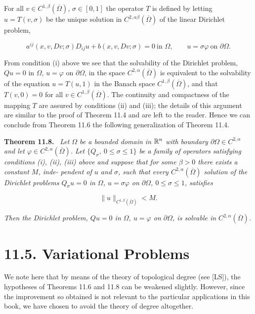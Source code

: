 \noindent For all $v\in C^{1,\beta}(\overline{\Omega})$, $\sigma\in[0,1]$ the operator $T$ is defined by letting $u=T(v,\sigma)$ be the
unique solution in $C^{2,\alpha\beta}(\overline{\Omega})$ of the linear Dirichlet problem,

\[
a^{ij}(x,v,Dv;\sigma)D_{ij}u+b(x,v,Dv;\sigma)=0\ \text{in }\Omega,\qquad u=\sigma\varphi\ \text{on }\partial\Omega.
\]

\noindent From condition (i) above we see that the solvability of the Dirichlet problem,
$Qu=0$ in $\Omega$, $u=\varphi$ on $\partial\Omega$, in the space $C^{2,\alpha}(\overline{\Omega})$ is equivalent to the solvability of
the equation $u=T(u,1)$ in the Banach space $C^{1,\beta}(\overline{\Omega})$, and that $T(v,0)=0$ for all
$v\in C^{1,\beta}(\overline{\Omega})$. The continuity and compactness of the mapping $T$ are assured by
conditions (ii) and (iii); the details of this argument are similar to the proof of
Theorem 11.4 and are left to the reader. Hence we can conclude from Theorem 11.6
the following generalization of Theorem 11.4.

\bigskip

\noindent \textbf{Theorem 11.8.} \ \emph{Let $\Omega$ be a bounded domain in $\mathbb{R}^n$ with boundary $\partial\Omega\in C^{2,\alpha}$ and let
$\varphi\in C^{2,\alpha}(\overline{\Omega})$. Let $\{Q_{\sigma},\ 0\leq \sigma\leq 1\}$ be a family of operators satisfying conditions
(i), (ii), (iii) above and suppose that for some $\beta>0$ there exists a constant $M$, inde-
pendent of $u$ and $\sigma$, such that every $C^{2,\alpha}(\overline{\Omega})$ solution of the Dirichlet problems
$Q_{\sigma}u=0$ in $\Omega$, $u=\sigma\varphi$ on $\partial\Omega$, $0\leq \sigma\leq 1$, satisfies}

\[
\|u\|_{C^{1,\beta}(\overline{\Omega})}<M.
\]

\noindent \emph{Then the Dirichlet problem, $Qu=0$ in $\Omega$, $u=\varphi$ on $\partial\Omega$, is solvable in $C^{2,\alpha}(\overline{\Omega})$.}



\section*{11.5. Variational Problems}

We note here that by means of the theory of topological degree (see [LS]), the hypotheses of Theorems 11.6 and 11.8 can be weakened slightly. However, since the improvement so obtained is not relevant to the particular applications in this book, we have chosen to avoid the theory of degree altogether.

